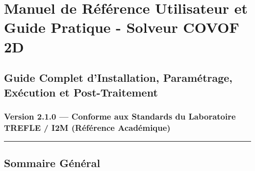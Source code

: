 \documentclass[
  french,
]{article}
\author{}
\date{}
\begin{document}
\section{Manuel de Référence Utilisateur et Guide Pratique - Solveur
COVOF
2D}\label{manuel-de-ruxe9fuxe9rence-utilisateur-et-guide-pratique---solveur-covof-2d}

\subsection{Guide Complet d'Installation, Paramétrage, Exécution et
Post-Traitement}\label{guide-complet-dinstallation-paramuxe9trage-exuxe9cution-et-post-traitement}

\subsubsection{Version 2.1.0 --- Conforme aux Standards du Laboratoire
TREFLE / I2M (Référence
Académique)}\label{version-2.1.0-conforme-aux-standards-du-laboratoire-trefle-i2m-ruxe9fuxe9rence-acaduxe9mique}

\begin{center}\rule{0.5\linewidth}{0.5pt}\end{center}

\subsection{Sommaire Général}\label{sommaire-guxe9nuxe9ral}
\end{document}
